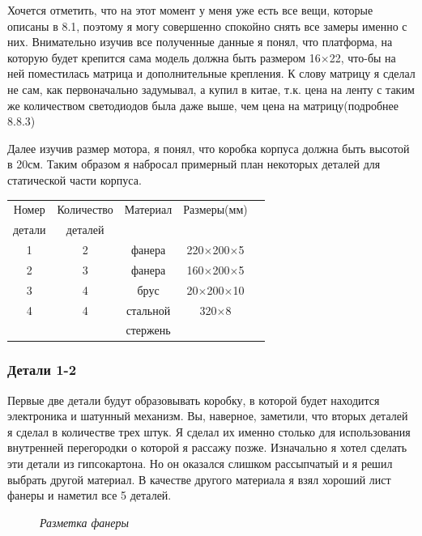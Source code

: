 \documentclass[a4paper, 12pt]{article}
\newcommand{\image}[3]{
	\begin{figure}[ht]
		\center{\texttt{[image: img/\#1]} }
		\caption{\textit{#3}}\end{figure}
}
\begin{document}
Хочется отметить, что на этот момент у меня уже есть все вещи, которые описаны
в 8.1, поэтому я могу совершенно спокойно снять все замеры именно с них.
Внимательно изучив все полученные данные я понял, что платформа, на которую
будет крепится сама модель должна быть размером 16$\times$22, что-бы на ней
поместилась матрица и дополнительные крепления. К слову матрицу я сделал не
сам, как первоначально задумывал, а купил в китае, т.к. цена на ленту с таким
же количеством светодиодов была даже выше, чем цена на матрицу(подробнее 8.8.3)

Далее изучив размер мотора, я понял, что коробка корпуса должна быть высотой в
20см. Таким образом я набросал примерный план некоторых деталей для статической
части корпуса.
\\
\begin{center}
  \begin{tabular}{ |c|c|c|c|c|}
    \hline
    Номер  & Количество & Материал & Размеры(мм)             \\
    детали & деталей    &          &                         \\
    \hline
    1      & 2          & фанера   & 220$\times$200$\times$5 \\
    \hline
    2      & 3          & фанера   & 160$\times$200$\times$5 \\
    \hline
    3      & 4          & брус     & 20$\times$200$\times$10 \\
    \hline
    4      & 4          & стальной & 320$\times$8            \\
           &            & стержень &                         \\
    \hline
  \end{tabular}
\end{center}
\subsubsection{Детали 1-2}

Первые две детали будут образовывать коробку, в которой будет находится
электроника и шатунный механизм. Вы, наверное, заметили, что вторых деталей
я сделал в количестве трех штук. Я сделал их именно столько для использования
внутренней перегородки о которой я рассажу позже. Изначально я хотел сделать
эти детали из гипсокартона. Но он оказался слишком рассыпчатый и я решил 
выбрать другой материал. В качестве другого материала я взял хороший лист 
фанеры и наметил все 5 деталей.

\image{разметка фанеры.jpg}{180}{Разметка фанеры}
\end{document}
